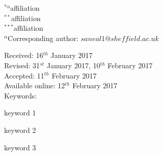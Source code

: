 \documentclass[paper=a4,fontsize=11pt,twocolumn]{article}
\begin{document}
		\setlength{\columnseprule}{1pt}
		\def\columnseprulecolor{\color{brand-secondary}}
		\begin{multicols}{2}
			\small{$^{*\alpha}$affiliation\smallskip\\
				$^{**}$affiliation\smallskip\\
				$^{***}$affiliation}\bigskip\smallskip\\
			\vfill
			\small{$^{\alpha}$Corresponding author: $saneal1@sheffield.ac.uk$}
			\columnbreak

			\hangindent=0.8cm 
			\small{
				\hspace{8mm}Received: 16$^{th}$ January 2017\smallskip\\
				Revised: 31$^{st}$ January 2017, 10$^{th}$ February 2017\smallskip\\
				Accepted: 11$^{th}$ February 2017\smallskip\\
				Available online: 12$^{th}$ February 2017\bigskip\\
				\vfill
				\hspace{8mm}Keywords: \colorbox{brand-midlight}{\strut keyword 1} \colorbox{brand-midlight}{\strut keyword 2} \colorbox{brand-midlight}{\strut keyword 3}
				}
		\end{multicols}
		\bigskip		
\end{document}
